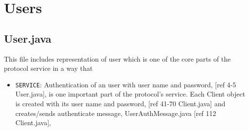 \documentclass[12pt]{usenixsubmit}
\begin{document}
  \section{Users}
  \subsection{User.java} This file includes representation of user which is one of the core parts of the protocol service in a way that 
  \begin{itemize}
  \item {\tt SERVICE}: Authentication of an user with user name and password, [ref 4-5 User.java],  is one important part of the protocol's service. Each Client object is created with its user name and password, [ref 41-70 Client.java] and creates/sends authenticate message, UserAuthMessage.java [ref 112 Client.java], 
    \end{itemize}
\end{document}
